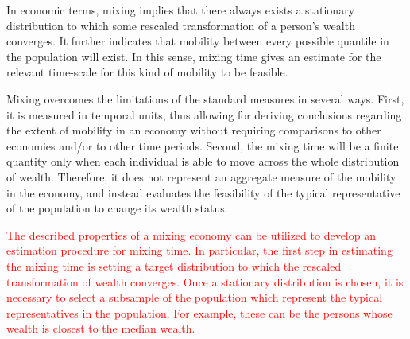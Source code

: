 \documentclass[11pt]{article}
\numberwithin{equation}{section}
\begin{document}
In economic terms, mixing implies that there always exists a stationary distribution to which some rescaled transformation of a person's wealth converges. It further indicates that mobility between every possible quantile in the population will exist. In this sense, mixing time gives an estimate for the relevant time-scale for this kind of mobility to be feasible.

Mixing overcomes the limitations of the standard measures in several ways. First, it is measured in temporal units, thus allowing for deriving conclusions regarding the extent of mobility in an economy without requiring comparisons to other economies and/or to other time periods. Second, the mixing time will be a finite quantity only when each individual is able to move across the whole distribution of wealth. Therefore, it does not represent an aggregate measure of the mobility in the economy, and instead evaluates the feasibility of the typical representative of the population to change its wealth status.


\textcolor{red}{The described properties of a mixing economy can be utilized to develop an estimation procedure for mixing time. In particular, the first step in estimating the mixing time is setting a target distribution to which the rescaled transformation of wealth converges. Once a stationary distribution is chosen, it is necessary to select a subsample of the population which represent the typical representatives in the population. For example, these can be the persons whose wealth is closest to the median wealth.}
\end{document}
